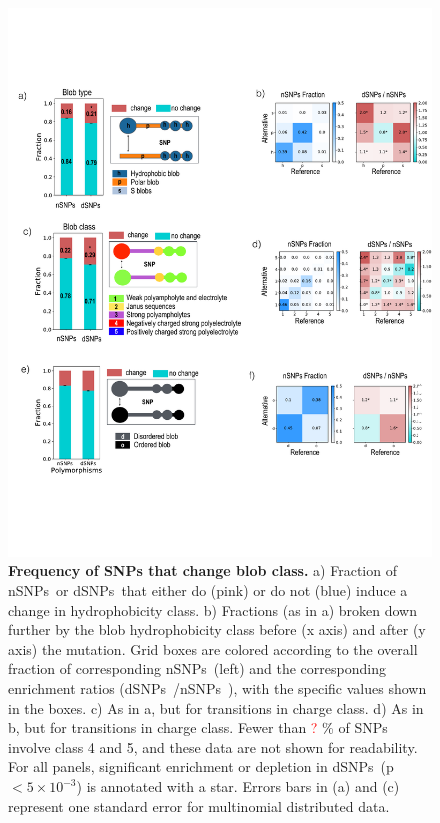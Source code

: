 \documentclass[10pt,letterpaper]{article}
\newcommand{\dSNPs}{dSNPs~}
\newcommand{\nSNPs}{nSNPs~}
\newcommand{\hydrochar}{hydrophobicity class}
\newcommand{\chargechar}{charge class}
\newcommand{\grace}[1]{\textcolor{red}{#1}}
\begin{document}
\begin{figure}[!ht]
\includegraphics[scale=0.1,width=\textwidth,trim={0 0cm 0 0cm},clip]{./figures/fig2.pdf}
\caption{{\bf Frequency of SNPs that change blob class.} a) Fraction of \nSNPs or \dSNPs that either do (pink) or do not (blue) induce a change in \hydrochar.  b) Fractions (as in a) broken down further by the blob \hydrochar{} before (x axis) and after (y axis) the mutation.  Grid boxes are colored according to the overall fraction of corresponding \nSNPs (left) and the corresponding enrichment ratios (\dSNPs/\nSNPs), with the specific values shown in the boxes. c) As in a, but for transitions in \chargechar. d) As in b, but for transitions in \chargechar.  Fewer than \grace{?} \% of SNPs involve class 4 and 5, and these data are not shown for readability.  For all panels, significant enrichment or depletion in \dSNPs  (p $< 5\times10^{-3}$) is annotated with a star. Errors bars in (a) and (c) represent one standard error for multinomial distributed data.}
\label{blob_transition} 
\end{figure}
\end{document}
